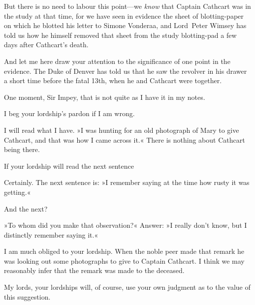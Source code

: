 \begin{dialogue}
\smallskip 

But there is no need to labour this point—we \textit{know} that Captain Cathcart was in the study at that time, for we have seen in evidence the sheet of blotting-paper on which he blotted his letter to Simone Vonderaa, and Lord~Peter Wimsey has told us how he himself removed that sheet from the study blotting-pad a few days after Cathcart's death.

\smallskip 

And let me here draw your attention to the significance of one point in the evidence. The Duke of Denver has told us that he saw the revolver in his drawer a short time before the fatal 13th, when he and Cathcart were together.


 One moment, Sir Impey, that is not quite as I have it in my notes.

 I beg your lordship's pardon if I am wrong.

 I will read what I have. »I was hunting for an old photograph of Mary to give Cathcart, and that was how I came across it.« There is nothing about Cathcart being there.

 If your lordship will read the next sentence\longdash

 Certainly. The next sentence is: »I remember saying at the time how rusty it was getting.«

 And the next?

 »To whom did you make that observation?« Answer: »I really don't know, but I distinctly remember saying it.«

 I am much obliged to your lordship. When the noble peer made that remark he was looking out some photographs to give to Captain Cathcart. I think we may reasonably infer that the remark was made to the deceased.

  My lords, your lordships will, of course, use your own judgment as to the value of this suggestion.


\end{dialogue}
